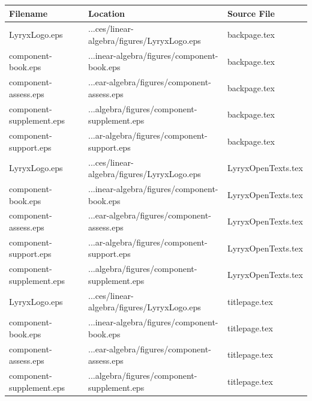 \documentclass[11pt]{article}
\begin{document}
\begin{longtable}{|p{5cm}|p{4cm}|p{4cm}|}
\hline
\textbf{Filename} & \textbf{Location} & \textbf{Source File} \\
\hline
\endhead

LyryxLogo.eps & ...ces/linear-algebra/figures/LyryxLogo.eps & backpage.tex \\
\hline

component-book.eps & ...inear-algebra/figures/component-book.eps & backpage.tex \\
\hline

component-assess.eps & ...ear-algebra/figures/component-assess.eps & backpage.tex \\
\hline

component-supplement.eps & ...algebra/figures/component-supplement.eps & backpage.tex \\
\hline

component-support.eps & ...ar-algebra/figures/component-support.eps & backpage.tex \\
\hline

LyryxLogo.eps & ...ces/linear-algebra/figures/LyryxLogo.eps & LyryxOpenTexts.tex \\
\hline

component-book.eps & ...inear-algebra/figures/component-book.eps & LyryxOpenTexts.tex \\
\hline

component-assess.eps & ...ear-algebra/figures/component-assess.eps & LyryxOpenTexts.tex \\
\hline

component-support.eps & ...ar-algebra/figures/component-support.eps & LyryxOpenTexts.tex \\
\hline

component-supplement.eps & ...algebra/figures/component-supplement.eps & LyryxOpenTexts.tex \\
\hline

LyryxLogo.eps & ...ces/linear-algebra/figures/LyryxLogo.eps & titlepage.tex \\
\hline

component-book.eps & ...inear-algebra/figures/component-book.eps & titlepage.tex \\
\hline

component-assess.eps & ...ear-algebra/figures/component-assess.eps & titlepage.tex \\
\hline

component-supplement.eps & ...algebra/figures/component-supplement.eps & titlepage.tex \\
\hline


\end{longtable}
\end{document}
